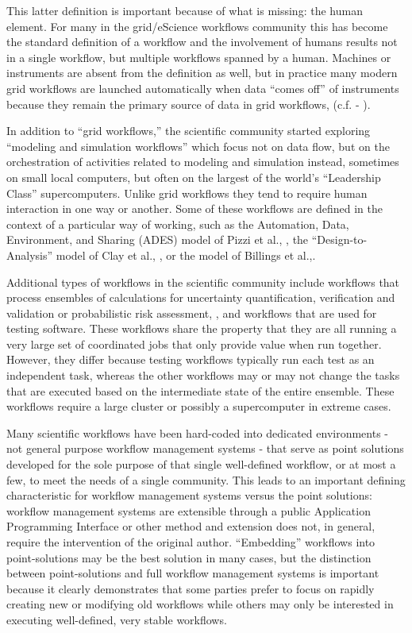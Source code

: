 This latter definition is important because of what is missing: the human
element. For many in the grid/eScience workflows community this has become the
standard definition of a workflow and the involvement of humans results not in a
single workflow, but multiple workflows spanned by a human.  Machines or
instruments are absent from the definition as well, but in practice many modern
grid workflows are launched automatically when data ``comes off'' of instruments
because they remain the primary source of data in grid workflows, (c.f. -
\cite{megino_panda:_2015}).

In addition to ``grid workflows,'' the scientific community started exploring
``modeling and simulation workflows'' which focus not on data flow, but on the
orchestration of activities related to modeling and simulation instead,
sometimes on small local computers, but often on the largest of the world's
``Leadership Class'' supercomputers. Unlike grid workflows they tend to require
human interaction in one way or another.  Some of these workflows are defined in
the context of a particular way of working, such as the Automation, Data,
Environment, and Sharing (ADES) model of Pizzi et al., \cite{pizzi_aiida:_2016},
the ``Design-to-Analysis'' model of Clay et al., \cite{clay_incorporating_2015},
or the model of Billings et al.,\cite{billings_eclipse_2017}.

Additional types of workflows in the scientific community include workflows that
process ensembles of calculations for uncertainty quantification, verification
and validation or probabilistic risk assessment, \cite{montoya_apex_2016}, and
workflows that are used for testing software. These workflows share the property
that they are all running a very large set of coordinated jobs that only provide
value when run together. However, they differ because testing workflows
typically run each test as an independent task, whereas the other workflows may
or may not change the tasks that are executed based on the intermediate state of
the entire ensemble. These workflows require a large cluster or possibly a
supercomputer in extreme cases.

Many scientific workflows have been hard-coded into dedicated environments - not
general purpose workflow management systems - that serve as point solutions
developed for the sole purpose of that single well-defined workflow, or at most
a few, to meet the needs of a single community. This leads to an important
defining characteristic for workflow management systems versus the point
solutions: workflow management systems are extensible through a public
Application Programming Interface or other method and extension does not, in
general, require the intervention of the original author. ``Embedding'' workflows
into point-solutions may be the best solution in many cases, but the
distinction between point-solutions and full workflow management systems is
important because it clearly demonstrates  that some parties prefer to focus on
rapidly creating new or modifying old workflows while others may only be
interested in executing well-defined, very stable workflows.

